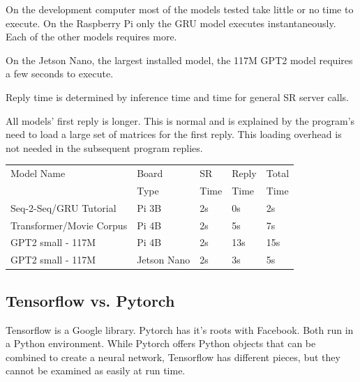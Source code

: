 On the development computer most of the models tested take little or no time to execute. On the Raspberry Pi only the GRU model executes instantaneously. Each of the other models requires more.  %

On the Jetson Nano, the largest installed model, the 117M GPT2 model requires a few seconds to execute. %

Reply time is determined by inference time and time for general SR server calls.

All models' first reply is longer. This is normal and is explained by the program's need to load a large set of matrices for the first reply. This loading overhead is not needed in the subsequent program replies. %

\label{setup-reply-time}

\begin{table}[H]
	
	\begin{center}
		
		
		\begin{tabular}{lllll}
			
			Model Name    & Board  & SR  & Reply    & Total  \\
			&  Type & Time  & Time    & Time  \\
			\hline
			\hline
			Seq-2-Seq/GRU Tutorial & Pi 3B     & 2s & 0s             & 2s   \\
			Transformer/Movie Corpus & Pi 4B      & 2s & 5s  & 7s      \\
			GPT2 small - 117M   & Pi 4B     & 2s   & 13s         & 15s      \\
			GPT2 small - 117M   & Jetson Nano & 2s   & 3s         & 5s      \\
			\hline
		\end{tabular}
		
		\bigskip
	\end{center}
	
	
	\label{fig:time-compare}
\end{table}


\subsection{Tensorflow vs. Pytorch}

Tensorflow is a Google library. Pytorch has it's roots with Facebook. Both run in a Python environment. While Pytorch offers Python objects that can be combined to create a neural network, Tensorflow has different pieces, but they cannot be examined as easily at run time.

